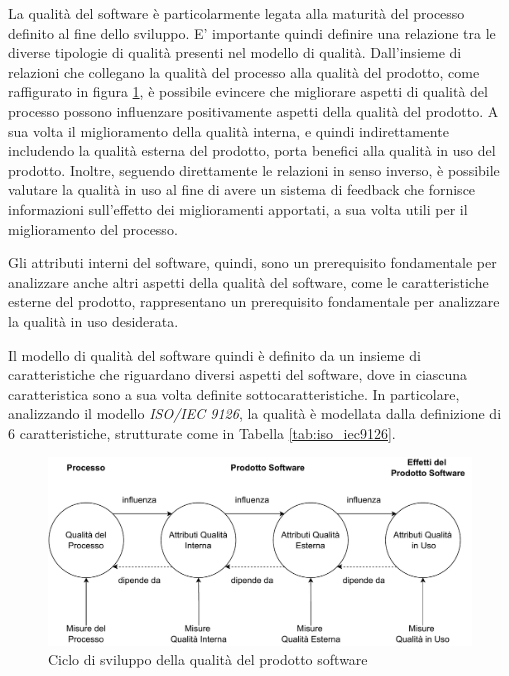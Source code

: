 La qualità del software è particolarmente legata alla maturità del processo definito al fine dello sviluppo.
E' importante quindi definire una relazione tra le diverse tipologie di qualità presenti nel modello di qualità.
Dall'insieme di relazioni che collegano la qualità del processo alla qualità del prodotto, come raffigurato in figura \ref{fig:quality_cycle_9126}, è possibile evincere che migliorare aspetti di qualità del processo possono influenzare positivamente aspetti della qualità del prodotto. A sua volta il miglioramento della qualità interna, e quindi indirettamente includendo la qualità esterna del prodotto, porta benefici alla qualità in uso del prodotto.
Inoltre, seguendo direttamente le relazioni in senso inverso, è possibile valutare la qualità in uso al fine di avere un sistema di feedback che fornisce informazioni sull'effetto dei miglioramenti apportati, a sua volta utili per il miglioramento del processo.



Gli attributi interni del software, quindi, sono un prerequisito fondamentale per analizzare anche altri aspetti della qualità del software, come le caratteristiche esterne del prodotto, rappresentano un prerequisito fondamentale per analizzare la qualità in uso desiderata.

Il modello di qualità del software quindi è definito da un insieme di caratteristiche che riguardano diversi aspetti del software, dove in ciascuna caratteristica sono a sua volta definite sottocaratteristiche. 
In particolare, analizzando il modello \textit{ISO/IEC 9126}, la qualità è modellata dalla definizione di 6 caratteristiche, strutturate come in Tabella \ref{tab:iso_iec9126}.

\begin{figure}[h]
    \centering
    \includegraphics[width=\textwidth]{Figure/Background/quality_cycle_process.pdf}
    \caption{Ciclo di sviluppo della qualità del prodotto software}
    \label{fig:quality_cycle_9126}
\end{figure}

